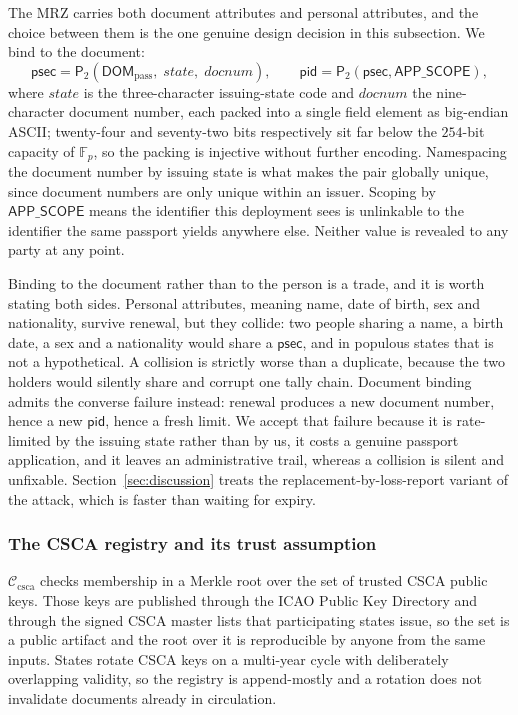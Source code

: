 \documentclass[11pt,a4paper]{article}
\theoremstyle{definition}
\theoremstyle{plain}
\theoremstyle{remark}
\newcommand{\pid}{\ensuremath{\mathsf{pid}}}
\newcommand{\psec}{\ensuremath{\mathsf{psec}}}
\newcommand{\PT}{\ensuremath{\mathsf{P}_2}}
\begin{document}
The MRZ carries both document attributes and personal attributes, and the choice between them is the one genuine design decision in this subsection. We bind to the document:
\[
\psec = \PT(\mathsf{DOM}_{\mathrm{pass}},\; \mathit{state},\; \mathit{docnum}), \qquad
\pid = \PT(\psec, \mathsf{APP\_SCOPE}),
\]
where $\mathit{state}$ is the three-character issuing-state code and $\mathit{docnum}$ the nine-character document number, each packed into a single field element as big-endian ASCII; twenty-four and seventy-two bits respectively sit far below the $254$-bit capacity of $\mathbb{F}_p$, so the packing is injective without further encoding. Namespacing the document number by issuing state is what makes the pair globally unique, since document numbers are only unique within an issuer. Scoping by $\mathsf{APP\_SCOPE}$ means the identifier this deployment sees is unlinkable to the identifier the same passport yields anywhere else. Neither value is revealed to any party at any point.

Binding to the document rather than to the person is a trade, and it is worth stating both sides. Personal attributes, meaning name, date of birth, sex and nationality, survive renewal, but they collide: two people sharing a name, a birth date, a sex and a nationality would share a $\psec$, and in populous states that is not a hypothetical. A collision is strictly worse than a duplicate, because the two holders would silently share and corrupt one tally chain. Document binding admits the converse failure instead: renewal produces a new document number, hence a new $\pid$, hence a fresh limit. We accept that failure because it is rate-limited by the issuing state rather than by us, it costs a genuine passport application, and it leaves an administrative trail, whereas a collision is silent and unfixable. Section~\ref{sec:discussion} treats the replacement-by-loss-report variant of the attack, which is faster than waiting for expiry.

\subsubsection{The CSCA registry and its trust assumption}
\label{sec:cscaroot}

$\mathcal{C}_{\mathrm{csca}}$ checks membership in a Merkle root over the set of trusted CSCA public keys. Those keys are published through the ICAO Public Key Directory and through the signed CSCA master lists that participating states issue, so the set is a public artifact and the root over it is reproducible by anyone from the same inputs. States rotate CSCA keys on a multi-year cycle with deliberately overlapping validity, so the registry is append-mostly and a rotation does not invalidate documents already in circulation.
\end{document}
